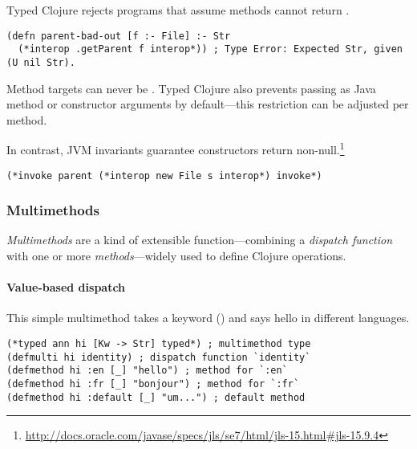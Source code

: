 Typed Clojure rejects programs that assume methods cannot return .
%
\begin{lstlisting}
(defn parent-bad-out [f :- File] :- Str
  (*interop .getParent f interop*)) ; Type Error: Expected Str, given (U nil Str).
\end{lstlisting}
Method targets can never be .
Typed Clojure also prevents passing  as Java method or
constructor arguments by default---this restriction can be
adjusted per method.

%
%
%
In contrast, JVM invariants guarantee constructors return non-null.\footnote{\url{http://docs.oracle.com/javase/specs/jls/se7/html/jls-15.html#jls-15.9.4}}
%
\begin{exmp}
\begin{lstlisting}
(*invoke parent (*interop new File s interop*) invoke*)
\end{lstlisting}
\end{exmp}


\subsubsection{Multimethods}

\label{sec:multioverview}

\emph{Multimethods} are a kind of extensible function---combining a \emph{dispatch function} with 
one or more \emph{methods}---widely used to define Clojure operations.

\paragraph{Value-based dispatch}
This simple multimethod takes a keyword () and says hello in different languages.%

\begin{exmp}
\begin{lstlisting}
(*typed ann hi [Kw -> Str] typed*) ; multimethod type
(defmulti hi identity) ; dispatch function `identity`
(defmethod hi :en [_] "hello") ; method for `:en`
(defmethod hi :fr [_] "bonjour") ; method for `:fr`
(defmethod hi :default [_] "um...") ; default method
\end{lstlisting}
\label{example:hi-multimethod}
\end{exmp}

